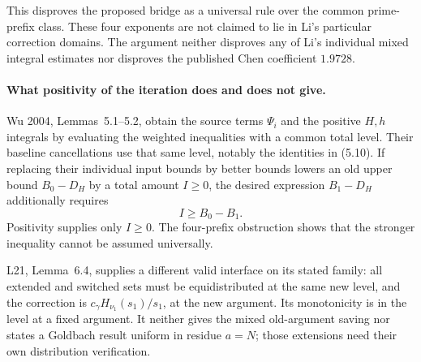 \documentclass[11pt]{article}
\begin{document}
This disproves the proposed bridge as a universal rule over the
common prime-prefix class. These four exponents are not claimed to
lie in Li's particular correction domains. The argument neither
disproves any of Li's individual mixed integral estimates nor
disproves the published Chen coefficient $1.9728$.

\paragraph{What positivity of the iteration does and does not give.}
Wu 2004, Lemmas~5.1--5.2, obtain the source terms $\Psi_i$ and the
positive $H,h$ integrals by evaluating the weighted inequalities with
a common total level. Their baseline cancellations use that same
level, notably the identities in (5.10). If replacing their individual
input bounds by better bounds lowers an old upper bound
$B_0-D_H$ by a total amount $I\ge0$, the desired expression
$B_1-D_H$ additionally requires
\[
 I\ge B_0-B_1.
\]
Positivity supplies only $I\ge0$. The four-prefix obstruction shows
that the stronger inequality cannot be assumed universally.

L21, Lemma~6.4, supplies a different valid interface on its stated
family: all extended and switched sets must be equidistributed at
the same new level, and the correction is
$c_\gamma H_{\nu_1}(s_1)/s_1$, at the new argument. Its monotonicity
is in the level at a fixed argument. It neither gives the mixed
old-argument saving nor states a Goldbach result uniform in residue
$a=N$; those extensions need their own distribution verification.
\end{document}
